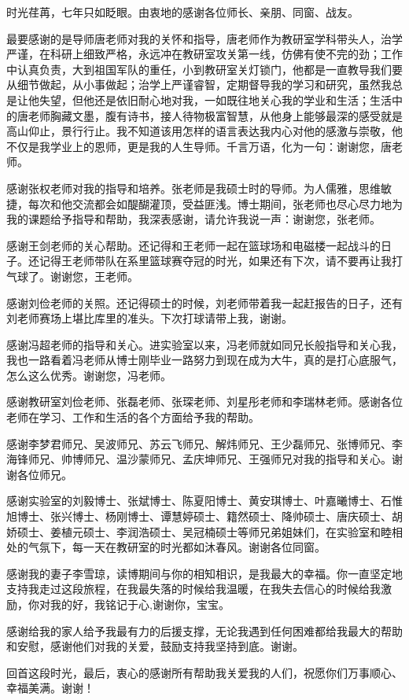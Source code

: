 
\begin{ack}
  时光荏苒，七年只如眨眼。由衷地的感谢各位师长、亲朋、同窗、战友。
  
  最要感谢的是导师唐老师对我的关怀和指导，唐老师作为教研室学科带头人，治学严谨，在科研上细致严格，永远冲在教研室攻关第一线，仿佛有使不完的劲；工作中认真负责，大到祖国军队的重任，小到教研室关灯锁门，他都是一直教导我们要从细节做起，从小事做起；治学上严谨睿智，定期督导我的学习和研究，虽然我总是让他失望，但他还是依旧耐心地对我，一如既往地关心我的学业和生活；生活中的唐老师胸藏文墨，腹有诗书，接人待物极富智慧，从他身上能够最深的感受就是高山仰止，景行行止。我不知道该用怎样的语言表达我内心对他的感激与崇敬，他不仅是我学业上的恩师，更是我的人生导师。千言万语，化为一句：谢谢您，唐老师。

  
  感谢张权老师对我的指导和培养。张老师是我硕士时的导师。为人儒雅，思维敏捷，每次和他交流都会如醍醐灌顶，受益匪浅。博士期间，张老师也尽心尽力地为我的课题给予指导和帮助，我深表感谢，请允许我说一声：谢谢您，张老师。

  
  感谢王剑老师的关心帮助。还记得和王老师一起在篮球场和电磁楼一起战斗的日子。还记得王老师带队在系里篮球赛夺冠的时光，如果还有下次，请不要再让我打气球了。谢谢您，王老师。 

  感谢刘俭老师的关照。还记得硕士的时候，刘老师带着我一起赶报告的日子，还有刘老师赛场上堪比库里的准头。下次打球请带上我，谢谢。
  
  感谢冯超老师的指导和关心。进实验室以来，冯老师就如同兄长般指导和关心我，我也一路看着冯老师从博士刚毕业一路努力到现在成为大牛，真的是打心底服气，怎么这么优秀。谢谢您，冯老师。
  
  感谢教研室刘俭老师、张磊老师、张琛老师、刘星彤老师和李瑞林老师。感谢各位老师在学习、工作和生活的各个方面给予我的帮助。
%  

  感谢李梦君师兄、吴波师兄、苏云飞师兄、解炜师兄、王少磊师兄、张博师兄、李海锋师兄、帅博师兄、温沙蒙师兄、孟庆坤师兄、王强师兄对我的指导和关心。谢谢各位师兄。
  
  感谢实验室的刘毅博士、张斌博士、陈夏阳博士、黄安琪博士、叶嘉曦博士、石惟旭博士、张兴博士、杨刚博士、谭慧婷硕士、籍然硕士、降帅硕士、唐庆硕士、胡娇硕士、姜植元硕士、李润浩硕士、吴冠楠硕士等师兄弟姐妹们，在实验室和睦相处的气氛下，每一天在教研室的时光都如沐春风。谢谢各位同窗。
  
  感谢我的妻子李雪琼，读博期间与你的相知相识，是我最大的幸福。你一直坚定地支持我走过这段旅程，在我最失落的时候给我温暖，在我失去信心的时候给我激励，你对我的好，我铭记于心,谢谢你，宝宝。
  
  感谢给我的家人给予我最有力的后援支撑，无论我遇到任何困难都给我最大的帮助和安慰，感谢他们对我的关爱，鼓励支持我坚持到底。谢谢。
  
  回首这段时光，最后，衷心的感谢所有帮助我关爱我的人们，祝愿你们万事顺心、幸福美满。谢谢！
  
  
\end{ack}
